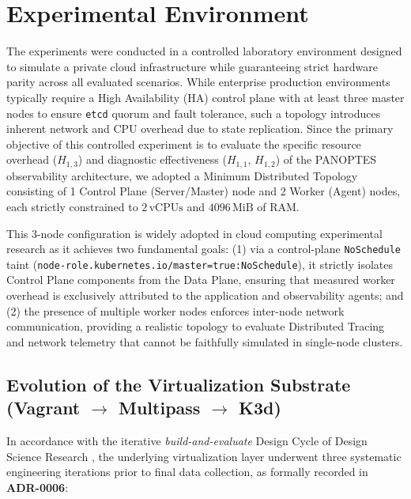 \section{Experimental Environment}
\label{sec:experimental-environment}

The experiments were conducted in a controlled laboratory environment designed to simulate a private cloud infrastructure while guaranteeing strict hardware parity across all evaluated scenarios. While enterprise production environments typically require a High Availability (HA) control plane with at least three master nodes \cite{brendan_tracey_2018} to ensure \texttt{etcd} quorum and fault tolerance, such a topology introduces inherent network and CPU overhead due to state replication. Since the primary objective of this controlled experiment is to evaluate the specific resource overhead ($H_{1,3}$) and diagnostic effectiveness ($H_{1,1}$, $H_{1,2}$) of the PANOPTES observability architecture, we adopted a Minimum Distributed Topology consisting of 1 Control Plane (Server/Master) node and 2 Worker (Agent) nodes, each strictly constrained to $2\,\text{vCPUs}$ and $4096\,\text{MiB}$ of RAM.

This 3-node configuration is widely adopted in cloud computing experimental research as it achieves two fundamental goals: (1) via a control-plane \texttt{NoSchedule} taint (\texttt{node-role.kubernetes.io/master=true:NoSchedule}), it strictly isolates Control Plane components from the Data Plane, ensuring that measured worker overhead is exclusively attributed to the application and observability agents; and (2) the presence of multiple worker nodes enforces inter-node network communication, providing a realistic topology to evaluate Distributed Tracing and network telemetry that cannot be faithfully simulated in single-node clusters.

\subsection{Evolution of the Virtualization Substrate \texorpdfstring{(Vagrant $\rightarrow$ Multipass $\rightarrow$ K3d)}{(Vagrant -> Multipass -> K3d)}}
\label{subsec:virtualization-evolution}

In accordance with the iterative \textit{build-and-evaluate} Design Cycle of Design Science Research \cite{hevner_2007, dresch_2015}, the underlying virtualization layer underwent three systematic engineering iterations prior to final data collection, as formally recorded in \textbf{ADR-0006}:

